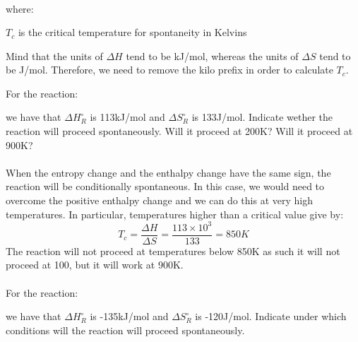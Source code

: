 \documentclass[main.tex]{subfiles}
\newcommand\chapterlabel{entropy}
\begin{document}
\begin{description}
\begin{equation}
\begin{split}
\label{\chapterlabel:equation7}
\end{split}\end{equation}
where:
\begin{where}
 \item $T_c$ is the critical temperature for spontaneity in Kelvins  
 \end{where}
 Mind that the units of $\Delta H$ tend to be kJ/mol, whereas the units of $\Delta S$ tend to be J/mol. Therefore, we need to remove the kilo prefix in order to calculate $T_c$.
\begin{example} %
For the reaction:
\begin{center}\end{center}
we have that $\Delta H_{R}^{\circ}$ is 113kJ/mol and $\Delta S_{R}^{\circ}$ is 133J/mol. Indicate wether the reaction will proceed spontaneously. Will it proceed at 200K? Will it proceed at 900K?\\
\\
When the entropy change and the enthalpy change have the same sign, the reaction will be conditionally spontaneous. In this case, we would need to overcome the positive enthalpy change and we can do this at very high temperatures. In particular, temperatures higher than a critical value give by:
\[T_c  = \frac{\Delta H}{\Delta S} =\frac{113\times 10^3}{133}=850K\]
The reaction will not proceed at temperatures below 850K as such it will not proceed at 100, but it will work at 900K.\\
\faDiamond\ \\
For the reaction:
\begin{center}\end{center}
we have that $\Delta H_{R}^{\circ}$ is -135kJ/mol and $\Delta S_{R}^{\circ}$ is -120J/mol. Indicate under which conditions will the reaction will proceed spontaneously.\\ 
\end{example}%


\end{description}
\end{document}
